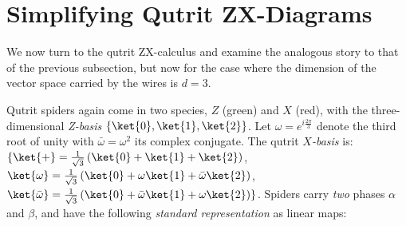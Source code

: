 \section{Simplifying Qutrit ZX-Diagrams}\label{sec:qutrits}

We now turn to the qutrit ZX-calculus and examine the analogous story to that of the previous subsection,
but now for the case where the dimension of the vector space carried by the wires is $d=3$.

Qutrit spiders again come in two species,
$Z$ (green) and $X$ (red),
with the three-dimensional \emph{Z-basis} $\{\ket{0},\ket{1},\ket{2}\}$.
Let $\omega = e^{i \frac{2\pi}{3}}$ denote the third root of unity
with $\bar\omega = \omega^2$ its complex conjugate.
The qutrit \emph{$X$-basis} is:
$\{ \ket{+} = \frac{1}{\sqrt{3}} \left(\ket{0} + \ket{1} + \ket{2}\right)$,
$\ket{\omega} = \frac{1}{\sqrt{3}} \left(\ket{0} + \omega\ket{1} + \bar{\omega}\ket{2}\right)$,
$\ket{\bar{\omega}} = \frac{1}{\sqrt{3}} \left(\ket{0} + \bar{\omega}\ket{1} + \omega\ket{2}\right) \} $.
Spiders carry \emph{two} phases $\alpha$ and $\beta$,
and have the following \emph{standard representation} as linear maps:
\begingroup
	\allowdisplaybreaks
	\setlength{\jot}{5pt}
